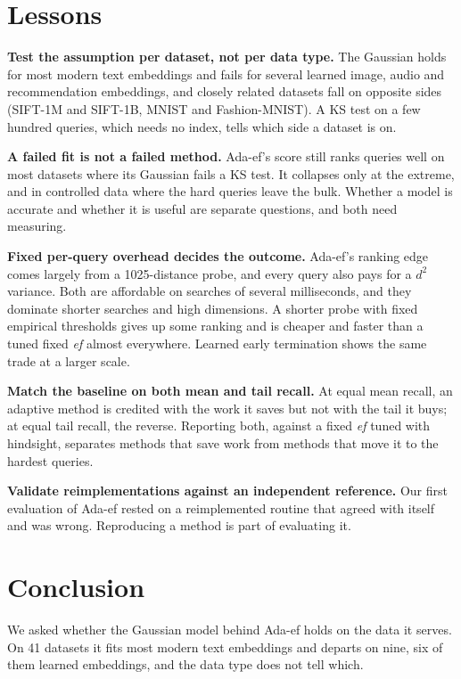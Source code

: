 \documentclass[twocolumn]{svjour3}
\newcommand{\ef}{\textit{ef}}
\begin{document}
\section{Lessons}

\textbf{Test the assumption per dataset, not per data type.} The Gaussian holds for most modern
text embeddings and fails for several learned image, audio and recommendation embeddings, and
closely related datasets fall on opposite sides (SIFT-1M and SIFT-1B, MNIST and Fashion-MNIST). A KS
test on a few hundred queries, which needs no index, tells which side a dataset is on.

\textbf{A failed fit is not a failed method.} Ada-ef's score still ranks queries well on most
datasets where its Gaussian fails a KS test. It collapses only at the extreme, and in controlled data
where the hard queries leave the bulk. Whether a model is accurate and whether it is useful are
separate questions, and both need measuring.

\textbf{Fixed per-query overhead decides the outcome.} Ada-ef's ranking edge comes largely from a
1025-distance probe, and every query also pays for a $d^2$ variance. Both are affordable on searches
of several milliseconds, and they dominate shorter searches and high dimensions. A shorter probe with fixed empirical thresholds gives up some ranking and is cheaper
and faster than a tuned fixed \ef{} almost everywhere. Learned early termination shows the same
trade at a larger scale.

\textbf{Match the baseline on both mean and tail recall.} At equal mean recall, an adaptive method is
credited with the work it saves but not with the tail it buys; at equal tail recall, the reverse.
Reporting both, against a fixed \ef{} tuned with hindsight, separates methods that save work from
methods that move it to the hardest queries.

\textbf{Validate reimplementations against an independent reference.} Our first evaluation of
Ada-ef rested on a reimplemented routine that agreed with itself and was wrong. Reproducing a method
is part of evaluating it.

\section{Conclusion}

We asked whether the Gaussian model behind Ada-ef holds on the data it serves. On 41 datasets it
fits most modern text embeddings and departs on nine, six of them learned embeddings, and the data
type does not tell which.
\end{document}
